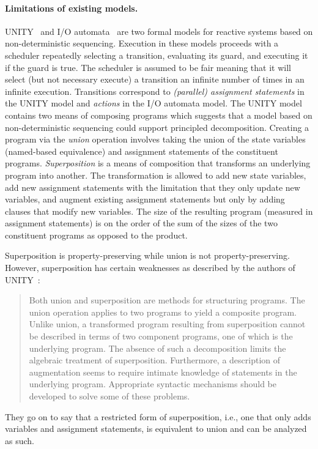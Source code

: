 \paragraph{Limitations of existing models.}
UNITY~\cite{chandy1989parallel} and I/O automata~\cite{nancy1996distributed} are two formal models for reactive systems based on non-deterministic sequencing.
Execution in these models proceeds with a scheduler repeatedly selecting a transition, evaluating its guard, and executing it if the guard is true.
The scheduler is assumed to be fair meaning that it will select (but not necessary execute) a transition an infinite number of times in an infinite execution.
Transitions correspond to \emph{(parallel) assignment statements} in the UNITY model and \emph{actions} in the I/O automata model.
The UNITY model contains two means of composing programs which suggests that a model based on non-deterministic sequencing could support principled decomposition.
Creating a program via the \emph{union} operation involves taking the union of the state variables (named-based equivalence) and assignment statements of the constituent programs.
\emph{Superposition} is a means of composition that transforms an underlying program into another.
The transformation is allowed to add new state variables, add new assignment statements with the limitation that they only update new variables, and augment existing assignment statements but only by adding clauses that modify new variables.
The size of the resulting program (measured in assignment statements) is on the order of the sum of the sizes of the two constituent programs as opposed to the product.

Superposition is property-preserving while union is not property-preserving.
However, superposition has certain weaknesses as described by the authors of UNITY~\cite{chandy1989parallel}:
\begin{quotation}
Both union and superposition are methods for structuring programs.
The union operation applies to two programs to yield a composite program.
Unlike union, a transformed program resulting from superposition cannot be described in terms of two component programs, one of which is the underlying program.
The absence of such a decomposition limits the algebraic treatment of superposition.
Furthermore, a description of augmentation seems to require intimate knowledge of statements in the underlying program.
Appropriate syntactic mechanisms should be developed to solve some of these problems.
\end{quotation}
They go on to say that a restricted form of superposition, i.e., one that only adds variables and assignment statements, is equivalent to union and can be analyzed as such.


